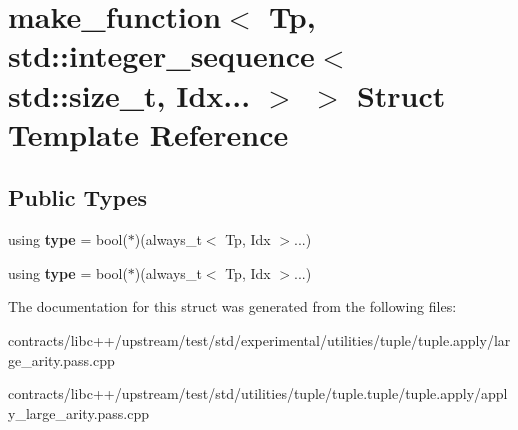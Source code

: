 \hypertarget{structmake__function_3_01_tp_00_01std_1_1integer__sequence_3_01std_1_1size__t_00_01_idx_8_8_8_01_4_01_4}{}\section{make\+\_\+function$<$ Tp, std\+:\+:integer\+\_\+sequence$<$ std\+:\+:size\+\_\+t, Idx... $>$ $>$ Struct Template Reference}
\label{structmake__function_3_01_tp_00_01std_1_1integer__sequence_3_01std_1_1size__t_00_01_idx_8_8_8_01_4_01_4}
\subsection*{Public Types}
\begin{DoxyCompactItemize}
\item 
\mbox{\label{structmake__function_3_01_tp_00_01std_1_1integer__sequence_3_01std_1_1size__t_00_01_idx_8_8_8_01_4_01_4_a689009e5ce6656e5d18bebd763ba3b93}} 
using {\bfseries type} = bool($\ast$)(always\+\_\+t$<$ Tp, Idx $>$...)
\item 
\mbox{\label{structmake__function_3_01_tp_00_01std_1_1integer__sequence_3_01std_1_1size__t_00_01_idx_8_8_8_01_4_01_4_a689009e5ce6656e5d18bebd763ba3b93}} 
using {\bfseries type} = bool($\ast$)(always\+\_\+t$<$ Tp, Idx $>$...)
\end{DoxyCompactItemize}


The documentation for this struct was generated from the following files\+:\begin{DoxyCompactItemize}
\item 
contracts/libc++/upstream/test/std/experimental/utilities/tuple/tuple.\+apply/large\+\_\+arity.\+pass.\+cpp\item 
contracts/libc++/upstream/test/std/utilities/tuple/tuple.\+tuple/tuple.\+apply/apply\+\_\+large\+\_\+arity.\+pass.\+cpp\end{DoxyCompactItemize}
